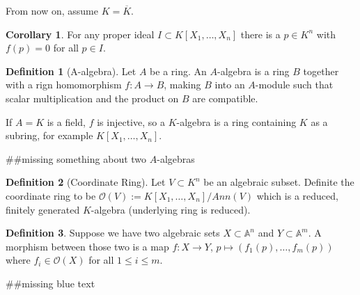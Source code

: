 \documentclass[a4paper]{book}
\theoremstyle{definition}
\newtheorem{definition}{Definition}[]
\newtheorem{corollary}{Corollary}
\begin{document}
From now on, assume \(K = \overline{K}\).
\begin{thmbox}    
    \begin{corollary}
        For any proper ideal \(I \subset K[X_1, \ldots, X_n]\) there is a \(p \in K^n\) with \(f(p) = 0\) for all \(p \in I\).
    \end{corollary}
\end{thmbox}

\begin{defbox}
    \begin{definition}[A-algebra]
        Let \(A\) be a ring. An \(A\)-algebra is a ring \(B\) together with a rign homomorphism \(f: A \longrightarrow B\), making \(B\) into an \(A\)-module such that scalar multiplication and the product on \(B\) are compatible.

        If \(A = K\) is a field, \(f\) is injective, so a \(K\)-algebra is a ring containing \(K\) as a subring, for example \(K[X_1, \ldots, X_n]\).

        \#\#missing something about two \(A\)-algebras
    \end{definition}
\end{defbox}

\begin{defbox}
    \begin{definition}[Coordinate Ring]
        Let \(V \subset K^n\) be an algebraic subset. Definite the coordinate ring to be \(\mathcal{O}(V) := K[X_1, \ldots, X_n] / Ann(V)\) which is a reduced, finitely generated \(K\)-algebra (underlying ring is reduced).
    \end{definition}
\end{defbox}

\begin{defbox}
    \begin{definition}
        Suppose we have two algebraic sets \(X \subset \mathbb{A}^n\) and \(Y \subset \mathbb{A}^m\). A morphism between those two is a map \(f: X \longrightarrow Y\), \(p \mapsto (f_1(p), \ldots, f_m(p))\) where \(f_i \in \mathcal{O}(X)\) for all \(1 \leq i \leq m\).
    \end{definition}
\end{defbox}

\#\#missing blue text
\end{document}
